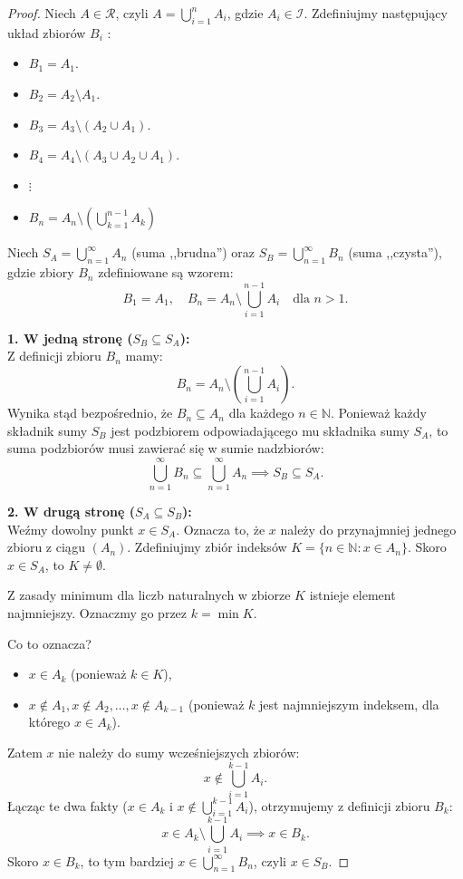 \begin{proof}
	Niech $A\in \mathcal{R}$, czyli $A = \bigcup_{i=1} ^{n}A_{i}$, gdzie $A_{i} \in  \mathcal{I}$.
	Zdefiniujmy następujący układ zbiorów $B_{i}$ :
	\begin{itemize}
		\item $B_1 = A_1$.
		\item $B_2 = A_2 \setminus A_1$.
		\item $B_3 = A_3\setminus \left( A_2 \cup A_1 \right) $.
		\item $B_4 = A_4\setminus \left( A_3\cup A_2 \cup A_1 \right) $.
		\item $\vdots$
		\item  $B_{n} = A_{n}\setminus \left( \bigcup_{k=1} ^{n-1}A_{k} \right) $
	\end{itemize}

    Niech $S_A = \bigcup_{n=1}^{\infty} A_n$ (suma ,,brudna'') oraz $S_B = \bigcup_{n=1}^{\infty} B_n$ (suma ,,czysta''), gdzie zbiory $B_n$ zdefiniowane są wzorem:
    \[
        B_1 = A_1, \quad B_n = A_n \setminus \bigcup_{i=1}^{n-1} A_i \quad \text{dla } n > 1.
    \]

    \noindent\textbf{1. W jedną stronę ($S_B \subseteq S_A$):} \\
    Z definicji zbioru $B_n$ mamy:
    \[
        B_n = A_n \setminus \left( \bigcup_{i=1}^{n-1} A_i \right).
    \]
    Wynika stąd bezpośrednio, że $B_n \subseteq A_n$ dla każdego $n \in \mathbb{N}$.
    Ponieważ każdy składnik sumy $S_B$ jest podzbiorem odpowiadającego mu składnika sumy $S_A$, to suma podzbiorów musi zawierać się w sumie nadzbiorów:
    \[
        \bigcup_{n=1}^{\infty} B_n \subseteq \bigcup_{n=1}^{\infty} A_n \implies S_B \subseteq S_A.
    \]

    \noindent\textbf{2. W drugą stronę ($S_A \subseteq S_B$):} \\
    Weźmy dowolny punkt $x \in S_A$. Oznacza to, że $x$ należy do przynajmniej jednego zbioru z ciągu $(A_n)$.
    Zdefiniujmy zbiór indeksów $K = \{ n \in \mathbb{N} : x \in A_n \}$. Skoro $x \in S_A$, to $K \neq \emptyset$.
    
    Z zasady minimum dla liczb naturalnych w zbiorze $K$ istnieje element najmniejszy. Oznaczmy go przez $k = \min K$.
    
    Co to oznacza?
    \begin{itemize}
        \item $x \in A_k$ (ponieważ $k \in K$),
        \item $x \notin A_1, x \notin A_2, \dots, x \notin A_{k-1}$ (ponieważ $k$ jest najmniejszym indeksem, dla którego $x \in A_k$).
    \end{itemize}
    Zatem $x$ nie należy do sumy wcześniejszych zbiorów:
    \[
        x \notin \bigcup_{i=1}^{k-1} A_i.
    \]
    Łącząc te dwa fakty ($x \in A_k$ i $x \notin \bigcup_{i=1}^{k-1} A_i$), otrzymujemy z definicji zbioru $B_k$:
    \[
        x \in A_k \setminus \bigcup_{i=1}^{k-1} A_i \implies x \in B_k.
    \]
    Skoro $x \in B_k$, to tym bardziej $x \in \bigcup_{n=1}^{\infty} B_n$, czyli $x \in S_B$.
    

\end{proof}
